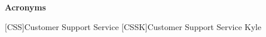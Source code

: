 
\newpage

\thispagestyle{empty}

\vspace*{2mm}

\begin{center}
{\bf \Huge Acronyms}
\end{center}

\vspace{5mm}

\begin{acronym}[CSSK] %

[CSS]{Customer Support Service}
[CSSK]{Customer Support Service Kyle}

\end{acronym}




